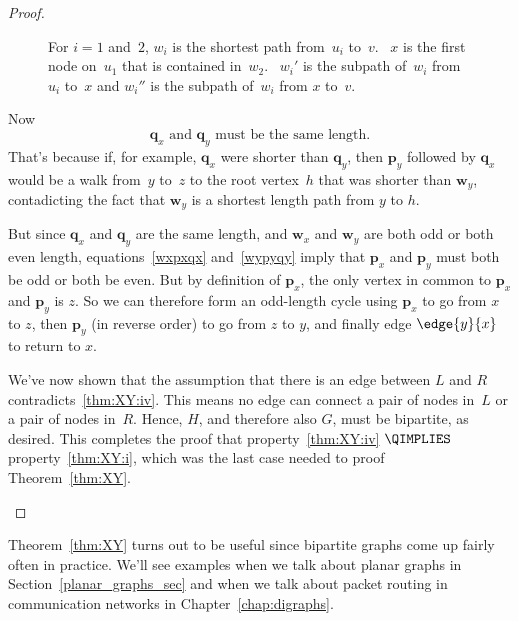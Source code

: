 \begin{proof}
\begin{description}
\begin{figure}



\caption{For $i = 1$ and~$2$, $w_i$ is the shortest path from~$u_i$
  to~$v$.  \ $x$ is the first node on~$u_1$ that is contained
  in~$w_2$. \ $w_i'$ is the subpath of~$w_i$ from $u_i$ to~$x$ and
  $w_i''$ is the subpath of~$w_i$ from $x$ to~$v$.}

\label{fig:XY3}

\end{figure}

Now
\[
\mathbf{q}_x \text{ and }\mathbf{q}_y\text{ must be the same length}.
\]
That's because if, for example, $\mathbf{q}_x$ were shorter than
$\mathbf{q}_y$, then $\mathbf{p}_y$ followed by $\mathbf{q}_x$ would
be a walk from~$y$ to~$z$ to the root vertex~$h$ that was shorter than
$\mathbf{w}_y$, contadicting the fact that $\mathbf{w}_y$ is a
shortest length path from $y$ to $h$.

But since $\mathbf{q}_x$ and $\mathbf{q}_y$ are the same length, and
$\mathbf{w}_x$ and $\mathbf{w}_y$ are both odd or both even length,
equations~\eqref{wxpxqx} and~\eqref{wypyqy} imply that $\mathbf{p}_x$
and $\mathbf{p}_y$ must both be odd or both be even.  But by
definition of $\mathbf{p}_x$, the only vertex in common to
$\mathbf{p}_x$ and $\mathbf{p}_y$ is $z$.  So we can therefore form an
odd-length cycle using $\mathbf{p}_x$ to go from $x$ to $z$, then
$\mathbf{p}_y$ (in reverse order) to go from $z$ to $y$, and finally
edge $\edge{y}{x}$ to return to $x$.

We've now shown that the assumption that there is an edge between $L$ and
$R$ contradicts~\ref{thm:XY:iv}.  This means no edge can connect a pair of
nodes in~$L$ or a pair of nodes in~$R$.  Hence, $H$, and therefore also
$G$, must be bipartite, as desired.  This completes the proof that
property~\ref{thm:XY:iv} $\QIMPLIES$ property~\ref{thm:XY:i}, which was
the last case needed to proof Theorem~\ref{thm:XY}.  \qedhere
\end{description}

\end{proof}

Theorem~\ref{thm:XY} turns out to be useful since bipartite graphs
come up fairly often in practice.  We'll see examples when we talk
about planar graphs in Section~\ref{planar_graphs_sec} and when we
talk about packet routing in communication networks in
Chapter~\ref{chap:digraphs}.

